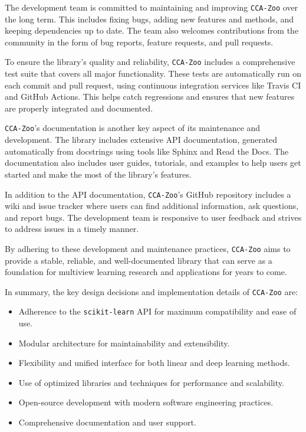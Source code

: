 The development team is committed to maintaining and improving \texttt{CCA-Zoo} over the long term. This includes fixing bugs, adding new features and methods, and keeping dependencies up to date. The team also welcomes contributions from the community in the form of bug reports, feature requests, and pull requests.

To ensure the library's quality and reliability, \texttt{CCA-Zoo} includes a comprehensive test suite that covers all major functionality. These tests are automatically run on each commit and pull request, using continuous integration services like Travis CI and GitHub Actions. This helps catch regressions and ensures that new features are properly integrated and documented.

\texttt{CCA-Zoo}'s documentation is another key aspect of its maintenance and development. The library includes extensive API documentation, generated automatically from docstrings using tools like Sphinx and Read the Docs. The documentation also includes user guides, tutorials, and examples to help users get started and make the most of the library's features.

In addition to the API documentation, \texttt{CCA-Zoo}'s GitHub repository includes a wiki and issue tracker where users can find additional information, ask questions, and report bugs. The development team is responsive to user feedback and strives to address issues in a timely manner.

By adhering to these development and maintenance practices, \texttt{CCA-Zoo} aims to provide a stable, reliable, and well-documented library that can serve as a foundation for multiview learning research and applications for years to come.

In summary, the key design decisions and implementation details of \texttt{CCA-Zoo} are:

\begin{itemize}
\item Adherence to the \texttt{scikit-learn} API for maximum compatibility and ease of use.
\item Modular architecture for maintainability and extensibility.
\item Flexibility and unified interface for both linear and deep learning methods.
\item Use of optimized libraries and techniques for performance and scalability.
\item Open-source development with modern software engineering practices.
\item Comprehensive documentation and user support.
\end{itemize}

